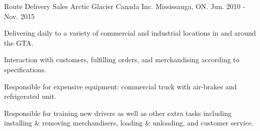 \begin{cventries}
  \cventry
    {Route Delivery Sales} %
    {Arctic Glacier Canada Inc.} %
    {Mississauga, ON.} %
    {Jun. 2010 - Nov. 2015} %
    {
    \begin{cvitems} %
      \item {Delivering daily to a variety of commercial and industrial locations in and around the GTA.}
      \item {Interaction with customers, fulfilling orders, and merchandising according to specifications.}
      \item {Responsible for expensive equipment: commercial truck with air-brakes and refrigerated unit.}
      \item {Responsible for training new drivers as well as other extra tasks including installing \& removing merchandisers, loading \& unloading, and customer service.}
    \end{cvitems}
    }

\end{cventries}
